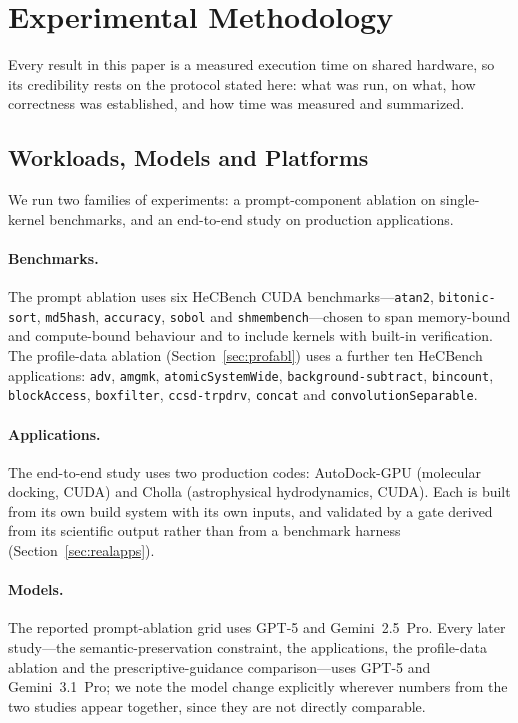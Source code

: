 \section{Experimental Methodology}
\label{sec:method}
Every result in this paper is a measured execution time on shared hardware, so its credibility
rests on the protocol stated here: what was run, on what, how correctness was established, and
how time was measured and summarized.

\subsection{Workloads, Models and Platforms}
\label{sec:explanation}
We run two families of experiments: a prompt-component ablation on single-kernel benchmarks, and an
end-to-end study on production applications.

\paragraph{Benchmarks.}
The prompt ablation uses six HeCBench \cite{jin2023hecbench} CUDA benchmarks---\texttt{atan2},
\texttt{bitonic-sort}, \texttt{md5hash}, \texttt{accuracy}, \texttt{sobol} and
\texttt{shmembench}---chosen to span memory-bound and compute-bound behaviour and to include kernels
with built-in verification. The profile-data ablation (Section~\ref{sec:profabl}) uses a further ten
HeCBench applications: \texttt{adv}, \texttt{amgmk}, \texttt{atomicSystemWide},
\texttt{background-subtract}, \texttt{bincount}, \texttt{blockAccess}, \texttt{boxfilter},
\texttt{ccsd-trpdrv}, \texttt{concat} and \texttt{convolutionSeparable}.

\paragraph{Applications.}
The end-to-end study uses two production codes: AutoDock-GPU (molecular docking, CUDA) and Cholla
(astrophysical hydrodynamics, CUDA). Each is built
from its own build system with its own inputs, and validated by a gate derived from its scientific
output rather than from a benchmark harness (Section~\ref{sec:realapps}).

\paragraph{Models.}
The reported prompt-ablation grid uses GPT-5 and Gemini~2.5~Pro. Every later study---the
semantic-preservation constraint, the applications, the profile-data ablation and the
prescriptive-guidance comparison---uses GPT-5 and Gemini~3.1~Pro; we note the model change explicitly wherever numbers from the two
studies appear together, since they are not directly comparable.

